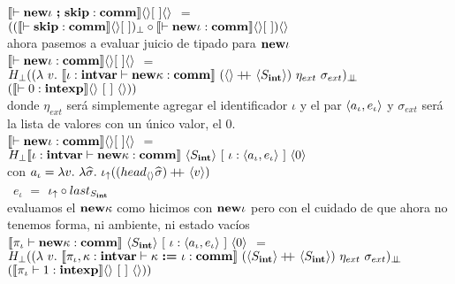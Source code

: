 \noindent
$\semBrcks{\vdash \cseq{\cnew \iota \ }{ \ \cskip} : \commt}\emptyshape\emptyenv\emptystate$ $=$
$((\llbracket \vdash \textbf{skip} : \textbf{comm} \rrbracket\langle  \rangle[ \ ])_{\bot}
\circ 
\llbracket \vdash \textbf{new} \iota : \textbf{comm} \rrbracket\langle  \rangle[ \ ]) \langle  \rangle$\\

ahora pasemos a evaluar juicio de tipado para $\textbf{new} \iota$\\

\noindent
$\llbracket \vdash \textbf{new} \iota : \textbf{comm} \rrbracket\langle  \rangle[ \ ]\langle  \rangle$
$=$ \\ \indent \indent
$H_{\bot} ((\lambda \ v . \ \semBrcks{\iota:\intvar \vdash \cnew \kappa : \commt}
		\ (\emptyshape \concat\lrangles{S_\intt}) \ \eta_{ext} \ \sigma_{ext})_{\dbot}$
\\ \indent \indent  \indent  \indent  \indent \indent  \indent
\indent \indent \indent \indent \indent \indent \indent
\indent \indent \indent
$(\semBrcks{\vdash 0 : \intexp}\emptyshape \ \emptyenv \ \emptystate))$\\

donde $\eta_{ext}$ ser\'a simplemente agregar el identificador $\iota$ y el
par $\langle a_\iota,e_\iota \rangle$ y $\sigma_{ext}$ ser\'a la lista de valores
con un \'unico valor, el $0$.\\

\noindent
$\llbracket \vdash \textbf{new} \iota : \textbf{comm} \rrbracket\langle  \rangle[ \ ]\langle  \rangle$
$=$
$H_{\bot} \semBrcks{\iota:\intvar \vdash \cnew \kappa : \commt}
				    \ \lrangles{S_\intt} \ 
		  	        [ \ \iota : \lrangles{a_\iota,e_\iota} \ ] \ \lrangles{0}$\\

con $a_\iota = \lambda v. \ \lambda \widehat{\sigma} . \ \iota_{\uparrow} 
				((head_{\langle  \rangle} \widehat{\sigma}) +\kern-1.3ex+\kern0.8ex \langle v \rangle)$\\
\indent \indent \ 
$e_\iota$ $=$ $ \iota_{\uparrow} \circ last_{S_{\textbf{int}}}$\\

evaluamos el $\textbf{new} \kappa$ como hicimos con $\textbf{new} \iota$ pero con el cuidado
de que ahora no tenemos forma, ni ambiente, ni estado vac\'ios\\

\noindent
$\semBrcks{\pi_\iota \vdash \cnew \kappa : \commt}
	\ \lrangles{S_\intt} \ 
	[ \ \iota : \lrangles{a_\iota,e_\iota} \ ] \ \lrangles{0}$ $=$ \\
\indent \indent
$H_{\bot} ((\lambda \ v . \ \semBrcks{\pi_\iota,\kappa:\intvar \vdash \assig{\kappa}{\iota}: \commt}
		\ (\lrangles{S_\intt} \concat\lrangles{S_\intt}) \ \eta_{ext} \ \sigma_{ext})_{\dbot}$
\\ \indent \indent  \indent  \indent  \indent \indent  \indent
\indent \indent \indent \indent \indent \indent \indent
\indent \indent \indent
$(\llbracket \pi_\iota \vdash 1 : \textbf{intexp} \rrbracket\langle  \rangle \ [ \ ] \ \langle  \rangle))$\\

